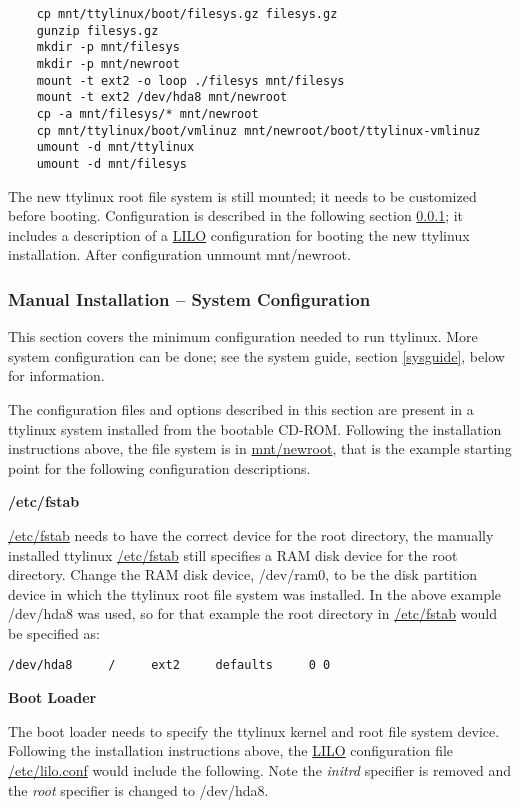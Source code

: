 \documentclass[10pt]{article}
\begin{document}
\begin{lstlisting}
	cp mnt/ttylinux/boot/filesys.gz filesys.gz
	gunzip filesys.gz
	mkdir -p mnt/filesys
	mkdir -p mnt/newroot
	mount -t ext2 -o loop ./filesys mnt/filesys
	mount -t ext2 /dev/hda8 mnt/newroot
	cp -a mnt/filesys/* mnt/newroot
	cp mnt/ttylinux/boot/vmlinuz mnt/newroot/boot/ttylinux-vmlinuz
	umount -d mnt/ttylinux
	umount -d mnt/filesys
\end{lstlisting}

The new ttylinux root file system is still mounted; it needs to be customized
before booting. Configuration is described in the following section
\ref{configuration}; it includes a description of a \url{LILO} configuration
for booting the new ttylinux installation. After configuration unmount
mnt/newroot.

\subsubsection{Manual Installation -- System Configuration}
\label{configuration}

This section covers the minimum configuration needed to run ttylinux. More
system configuration can be done; see the system guide, section \ref{sysguide},
below for information.

The configuration files and options described in this section are present in a
ttylinux system installed from the bootable CD-ROM. Following the installation
instructions above, the file system is in \url{mnt/newroot}, that is the
example starting point for the following configuration descriptions.

{\bf /etc/fstab}

\url{/etc/fstab} needs to have the correct device for the root directory, the
manually installed ttylinux \url{/etc/fstab} still specifies a RAM disk device
for the root directory. Change the RAM disk device, /dev/ram0, to be the disk
partition device in which the ttylinux root file system was installed. In the
above example /dev/hda8 was used, so for that example the root directory in
\url{/etc/fstab} would be specified as:

\begin{lstlisting}
/dev/hda8     /     ext2     defaults     0 0
\end{lstlisting}

{\bf Boot Loader}

The boot loader needs to specify the ttylinux kernel and root file system
device. Following the installation instructions above, the \url{LILO}
configuration file \url{/etc/lilo.conf} would include the following. Note the
{\it initrd} specifier is removed and the {\it root} specifier is changed to
/dev/hda8.
\end{document}

